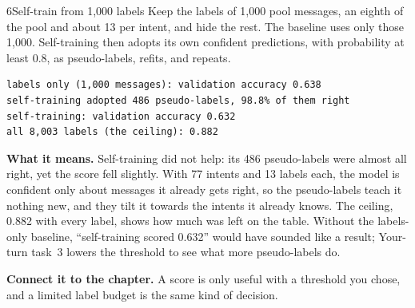 \begin{labquestion}{6}{Self-train from 1,000 labels}
Keep the labels of 1,000 pool messages, an eighth of the pool and about 13 per intent, and hide the rest. The baseline uses only those 1,000. Self-training then adopts its own confident predictions, with probability at least 0.8, as pseudo-labels, refits, and repeats.
\end{labquestion}
\begin{labanswer}

\begin{refoutput}
\begin{lstlisting}[style=utpterminal]
labels only (1,000 messages): validation accuracy 0.638
self-training adopted 486 pseudo-labels, 98.8% of them right
self-training: validation accuracy 0.632
all 8,003 labels (the ceiling): 0.882
\end{lstlisting}
\end{refoutput}

\textbf{What it means.} Self-training did not help: its 486 pseudo-labels were almost all right, yet the score fell slightly. With 77 intents and 13 labels each, the model is confident only about messages it already gets right, so the pseudo-labels teach it nothing new, and they tilt it towards the intents it already knows. The ceiling, 0.882 with every label, shows how much was left on the table. Without the labels-only baseline, ``self-training scored 0.632'' would have sounded like a result; Your-turn task~3 lowers the threshold to see what more pseudo-labels do.
\end{labanswer}

\textbf{Connect it to the chapter.} A score is only useful with a threshold you chose, and a limited label budget is the same kind of decision.


